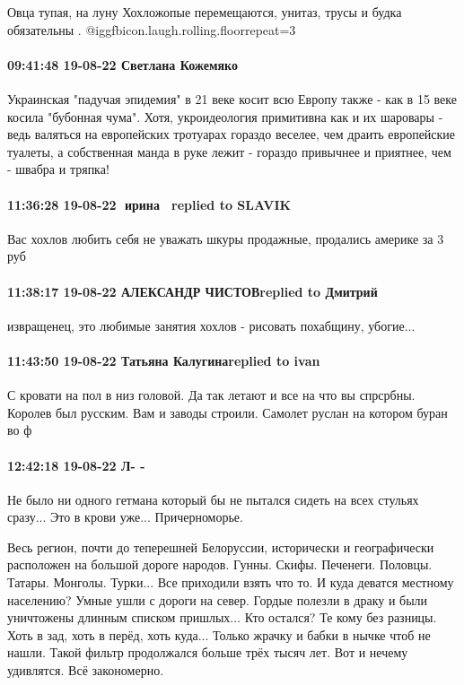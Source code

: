 Овца тупая, на луну Хохложопые перемещаются, унитаз, трусы и будка обязательны
. @igg{fbicon.laugh.rolling.floor}{repeat=3} 

\paragraph{09:41:48 19-08-22 Светлана Кожемяко}

Украинская "падучая эпидемия" в 21 веке косит всю Европу также - как в 15 веке
косила "бубонная чума".  Хотя, укроидеология примитивна как и их шаровары -
ведь валяться на европейских тротуарах гораздо веселее, чем драить европейские
туалеты, а собственная манда в руке лежит - гораздо привычнее и приятнее, чем -
швабра и тряпка!

\paragraph{11:36:28 19-08-22 🍏ирина 🍇🍇replied to SLAVIK}

Вас хохлов любить себя не уважать шкуры продажные, продались америке за 3 руб

\paragraph{11:38:17 19-08-22 АЛЕКСАНДР ЧИСТОВreplied to Дмитрий}

извращенец, это любимые занятия хохлов - рисовать похабщину, убогие...

\paragraph{11:43:50 19-08-22 Татьяна Калугинаreplied to ivan}

С кровати на пол в низ головой. Да так летают и все на что вы спрсрбны. Королев
был русским. Вам и заводы строили. Самолет руслан на котором буран во ф

\paragraph{12:42:18 19-08-22 Л- -}

Не было ни одного гетмана который бы не пытался сидеть на всех стульях сразу...
Это в крови уже... Причерноморье.

Весь регион, почти до теперешней Белоруссии, исторически и географически
расположен на большой дороге народов. Гунны. Скифы. Печенеги. Половцы. Татары.
Монголы. Турки... Все приходили взять что то. И куда деватся местному
населению? Умные ушли с дороги на север. Гордые полезли в драку и были
уничтожены длинным списком пришлых... Кто остался? Те кому без разницы. Хоть в
зад, хоть в перёд, хоть куда... Только жрачку и бабки в нычке чтоб не нашли.
Такой фильтр продолжался больше трёх тысяч лет. Вот и нечему удивлятся. Всё
закономерно.

